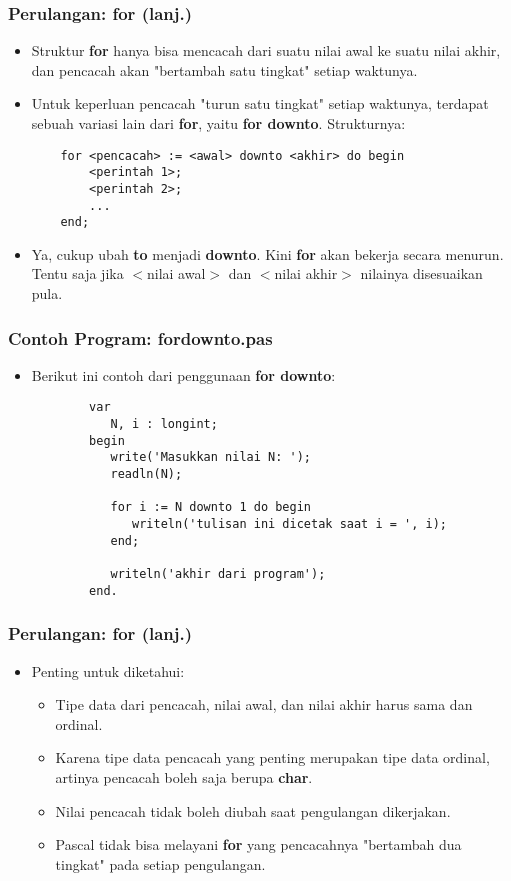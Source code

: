 \documentclass{beamer}
\begin{document}
\begin{frame}[fragile]
\frametitle{Perulangan: for (lanj.)}
\begin{itemize}
	\item Struktur \textbf{for} hanya bisa mencacah dari suatu nilai awal ke suatu nilai akhir, dan pencacah akan "bertambah satu tingkat" setiap waktunya.
	\item Untuk keperluan pencacah "turun satu tingkat" setiap waktunya, terdapat sebuah variasi lain dari \textbf{for}, yaitu \textbf{for downto}. Strukturnya:
	\begin{lstlisting}
	for <pencacah> := <awal> downto <akhir> do begin
	    <perintah 1>;
	    <perintah 2>;
	    ...
	end;
	\end{lstlisting}
	\item Ya, cukup ubah \alert{\textbf{to}} menjadi \alert{\textbf{downto}}. Kini \textbf{for} akan bekerja secara menurun. Tentu saja jika $<$nilai awal$>$ dan $<$nilai akhir$>$ nilainya disesuaikan pula.
\end{itemize}
\end{frame}

\begin{frame}[fragile]
\frametitle{Contoh Program: fordownto.pas}
\begin{itemize}
	\item Berikut ini contoh dari penggunaan \textbf{for downto}:
	\begin{lstlisting}
		var
		   N, i : longint;
		begin
		   write('Masukkan nilai N: ');
		   readln(N);
		
		   for i := N downto 1 do begin
		      writeln('tulisan ini dicetak saat i = ', i);
		   end;
		
		   writeln('akhir dari program');
		end.
	\end{lstlisting}
\end{itemize}
\end{frame}

\begin{frame}
\frametitle{Perulangan: for (lanj.)}
\begin{itemize}
	\item Penting untuk diketahui:
	\begin{itemize}
		\item Tipe data dari pencacah, nilai awal, dan nilai akhir harus sama dan \alert{ordinal}.
		\item Karena tipe data pencacah yang penting merupakan tipe data ordinal, artinya pencacah boleh saja berupa \textbf{char}.
		\item Nilai pencacah tidak boleh diubah saat pengulangan dikerjakan.
		\item Pascal tidak bisa melayani \textbf{for} yang pencacahnya "bertambah dua tingkat" pada setiap pengulangan.
	\end{itemize}
\end{itemize}
\end{frame}
\end{document}
